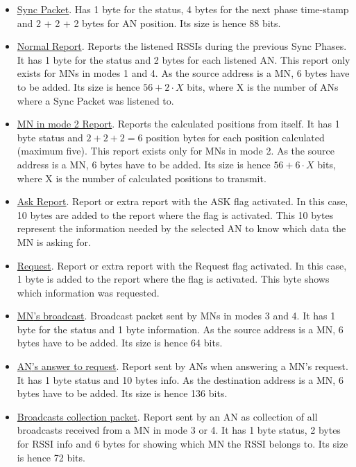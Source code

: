 \begin{itemize}
 \item \underline{Sync Packet}. Has 1 byte for the status, 4 bytes for the next phase time-stamp and 2 + 2 + 2 bytes for \ac{AN} position. 
Its size is hence 88 bits.
 \item \underline{Normal Report}. Reports the listened \acp{RSSI} during the previous Sync Phases. It has 1 byte for the status and 2 bytes 
for each listened \ac{AN}. This report only exists for \acp{MN} in modes 1 and 4. As the source address is a \ac{MN}, 6 bytes have to be added.
Its size is hence $56 + 2\cdot X$ bits, where X is the number of \acp{AN} where a Sync Packet was listened to.
 \item \underline{\ac{MN} in mode 2 Report}. Reports the calculated positions from itself. It has 1 byte status and $2 + 2 + 2 = 6$ position 
bytes for each position calculated (maximum five). This report exists only for \acp{MN} in mode 2. As the source address is a \ac{MN}, 6 bytes 
have to be added. Its size is hence $56 + 6\cdot X$ bits, where X is the number of calculated positions to transmit.
 \item \underline{Ask Report}. Report or extra report with the ASK flag activated. In this case, 10 bytes are added to the report where the
flag is activated. This 10 bytes represent the information needed by the selected \ac{AN} to know which data the \ac{MN} is asking for.
 \item \underline{Request}. Report or extra report with the Request flag activated. In this case, 1 byte is added to the report where the
flag is activated. This byte shows which information was requested.
 \item \underline{\ac{MN}'s broadcast}. Broadcast packet sent by \acp{MN} in modes 3 and 4. It has 1 byte for the status and 1 byte information.
As the source address is a \ac{MN}, 6 bytes have to be added. Its size is hence 64 bits.
 \item \underline{\ac{AN}'s answer to request}. Report sent by \acp{AN} when answering a \ac{MN}'s request. It has 1 byte status and 10 bytes info.
As the destination address is a \ac{MN}, 6 bytes have to be added. Its size is hence 136 bits.
 \item \underline{Broadcasts collection packet}. Report sent by an \ac{AN} as collection of all broadcasts received from a \ac{MN} in mode 3 
or 4. It has 1 byte status, 2 bytes for \ac{RSSI} info and 6 bytes for showing which \ac{MN} the \ac{RSSI} belongs to. Its size is hence 72 bits.
\end{itemize}


